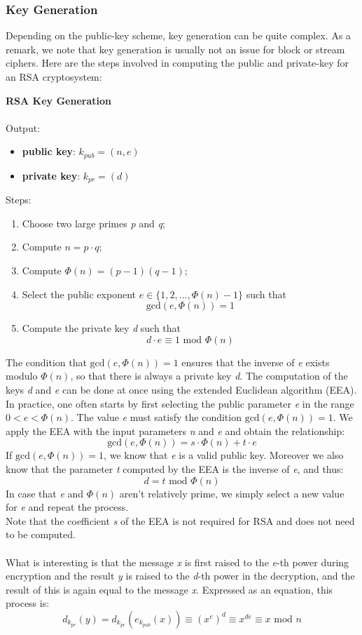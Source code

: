 \documentclass[11pt, a4paper]{article}
\newcommand{\mymod}{
    \text{ mod }
}
\begin{document}
\newpage
\subsubsection{Key Generation}
Depending on the public-key scheme, key generation can be quite complex. As a remark, we note that key generation is usually not an issue for block or stream ciphers. Here are the steps involved in computing the public and private-key for an RSA cryptosystem:
\begin{framed}
    \hfill\break\textbf{RSA Key Generation}\\\\
    Output:
    \begin{itemize}
        \item \textbf{public key}: $k_{pub}=(n,e)$
        \item \textbf{private key}: $k_{pr}=(d)$
    \end{itemize}
    Steps:
    \begin{enumerate}
        \item Choose two large primes \textit{p} and \textit{q};
        \item Compute $n=p\cdot q$;
        \item Compute $\Phi(n)=(p-1)(q-1)$;
        \item Select the public exponent $e\in\{1,2,...,\Phi(n)-1\}$ such that
        $$\text{gcd}(e,\Phi(n))=1$$
        \item Compute the private key \textit{d} such that
        $$d\cdot e\equiv1\mymod\Phi(n)$$
    \end{enumerate}
\end{framed}
The condition that $\text{gcd}(e,\Phi(n))=1$ ensures that the inverse of \textit{e} exists modulo $\Phi(n)$, so that there is always a private key \textit{d}. The computation of the keys \textit{d} and \textit{e} can be done at once using the extended Euclidean algorithm (EEA). In practice, one often starts by first selecting the public parameter \textit{e} in the range $0<e<\Phi(n)$. The value \textit{e} must satisfy the condition $\text{gcd}(e,\Phi(n))=1$. We apply the EEA with the input parameters \textit{n} and \textit{e} and obtain the relationship:
$$\text{gcd}(e,\Phi(n))=s\cdot\Phi(n)+t\cdot e$$
If $\text{gcd}(e,\Phi(n))=1$, we know that \textit{e} is a valid public key. Moreover we also know that the parameter \textit{t} computed by the EEA is the inverse of \textit{e}, and thus:
$$d=t\mymod\Phi(n)$$
In case that \textit{e} and $\Phi(n)$ aren't relatively prime, we simply select a new value for \textit{e} and repeat the process.\\Note that the coefficient \textit{s} of the EEA is not required for RSA and does not need to be computed.\\\\
What is interesting is that the message \textit{x} is first raised to the \textit{e}-th power during encryption and the result \textit{y} is raised to the \textit{d}-th power  in the decryption, and the result of this is again equal to the message \textit{x}. Expressed as an equation, this process is:
$$d_{k_{pr}}(y)=d_{k_{pr}}(e_{k_{pub}}(x))\equiv (x^e)^d\equiv x^{de}\equiv x\mymod n$$
\end{document}
